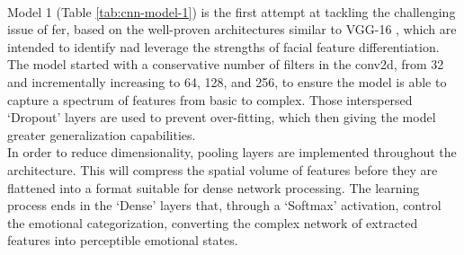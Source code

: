 \\
\indent Model 1 (Table \ref{tab:cnn-model-1}) is the first attempt at tackling the challenging issue of \gls{fer}, based on the well-proven architectures similar to VGG-16 \citep{simonyan2015deep}, which are intended to identify nad leverage the strengths of facial feature differentiation.
The model started with a conservative number of filters in the \gls{conv2d}, from 32 and incrementally increasing to 64, 128, and 256, to ensure the model is able to capture a spectrum of features from basic to complex. 
Those interspersed `Dropout' layers are used to prevent over-fitting, which then giving the model greater generalization capabilities.
\\
\indent In order to reduce dimensionality, pooling layers are implemented throughout the architecture.
This will compress the spatial volume of features before they are flattened into a format suitable for dense network processing.
The learning process ends in the `Dense' layers that, through a `Softmax' activation, control the emotional categorization, converting the complex network of extracted features into perceptible emotional states.
